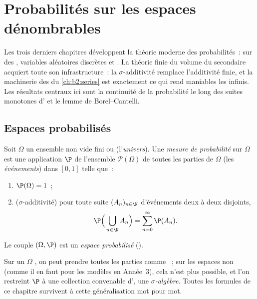 \chapter{Probabilités sur les espaces dénombrables}\label{ch:b2:proba}

Les trois derniers chapitres développent la théorie moderne des
probabilités~:  sur des 
, variables aléatoires discrètes et .
La théorie finie du volume du secondaire acquiert toute son
infrastructure~: la $\sigma$-additivité remplace l'additivité finie,
et la machinerie des  du \cref{ch:b2:series} est
exactement ce qui rend maniables les  infinis. Les résultats
centraux ici sont la continuité de la probabilité le long des suites
monotones d' et le lemme de Borel--Cantelli.

\section{Espaces probabilisés}

\begin{definition}\label{def:b2:proba:space}
Soit $\Omega$ un ensemble non vide fini ou  (l'\emph{univers}).
Une \emph{mesure de probabilité} sur $\Omega$ est
une application $\P$ de l'ensemble $\mathcal{P}(\Omega)$ de toutes les parties de
$\Omega$ (les \emph{événements}) dans $[0, 1]$ telle que~:
\begin{enumerate}
\item $\P(\Omega) = 1$~;
\item ($\sigma$-additivité) pour toute suite $(A_n)_{n\in\N}$
d'événements deux à deux disjoints,
\[
\P\Bigl(\,\bigcup_{n \in \N} A_n\Bigr)
= \sum_{n=0}^{\infty} \P(A_n) .
\]
\end{enumerate}
Le couple $(\Omega, \P)$ est un \emph{espace probabilisé} ().
\end{definition}

\begin{remark}
Sur un $\Omega$ , on peut prendre toutes les parties comme
~; sur les espaces non  (comme il en faut pour les
modèles  en Année~3), cela n'est plus possible, et l'on restreint
$\P$ à une collection convenable d', une \emph{$\sigma$-algèbre}.
Toutes les formules de ce chapitre survivent à cette généralisation
mot pour mot.
\end{remark}

